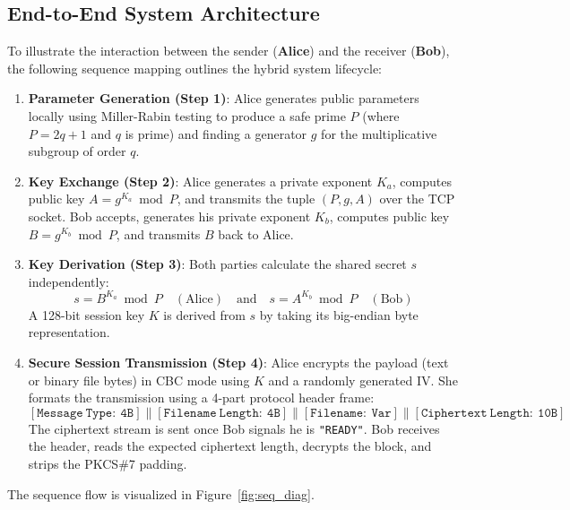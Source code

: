 \documentclass[11pt,a4paper]{article}
\begin{document}
\subsection{End-to-End System Architecture}
To illustrate the interaction between the sender (\textbf{Alice}) and the receiver (\textbf{Bob}), the following sequence mapping outlines the hybrid system lifecycle:

\begin{enumerate}
    \item \textbf{Parameter Generation (Step 1)}: Alice generates public parameters locally using Miller-Rabin testing to produce a safe prime $P$ (where $P = 2q + 1$ and $q$ is prime) and finding a generator $g$ for the multiplicative subgroup of order $q$.
    \item \textbf{Key Exchange (Step 2)}: Alice generates a private exponent $K_a$, computes public key $A = g^{K_a} \bmod P$, and transmits the tuple $(P, g, A)$ over the TCP socket. Bob accepts, generates his private exponent $K_b$, computes public key $B = g^{K_b} \bmod P$, and transmits $B$ back to Alice.
    \item \textbf{Key Derivation (Step 3)}: Both parties calculate the shared secret $s$ independently:
    \begin{equation}
        s = B^{K_a} \bmod P \quad (\text{Alice}) \quad \text{and} \quad s = A^{K_b} \bmod P \quad (\text{Bob})
    \end{equation}
    A 128-bit session key $K$ is derived from $s$ by taking its big-endian byte representation.
    \item \textbf{Secure Session Transmission (Step 4)}: Alice encrypts the payload (text or binary file bytes) in CBC mode using $K$ and a randomly generated IV. She formats the transmission using a 4-part protocol header frame:
    \begin{equation*}
        \mathtt{[Message\ Type:\ 4B]} \parallel \mathtt{[Filename\ Length:\ 4B]} \parallel \mathtt{[Filename:\ Var]} \parallel \mathtt{[Ciphertext\ Length:\ 10B]}
    \end{equation*}
    The ciphertext stream is sent once Bob signals he is \texttt{"READY"}. Bob receives the header, reads the expected ciphertext length, decrypts the block, and strips the PKCS\#7 padding.
\end{enumerate}

The sequence flow is visualized in Figure~\ref{fig:seq_diag}.
\end{document}
